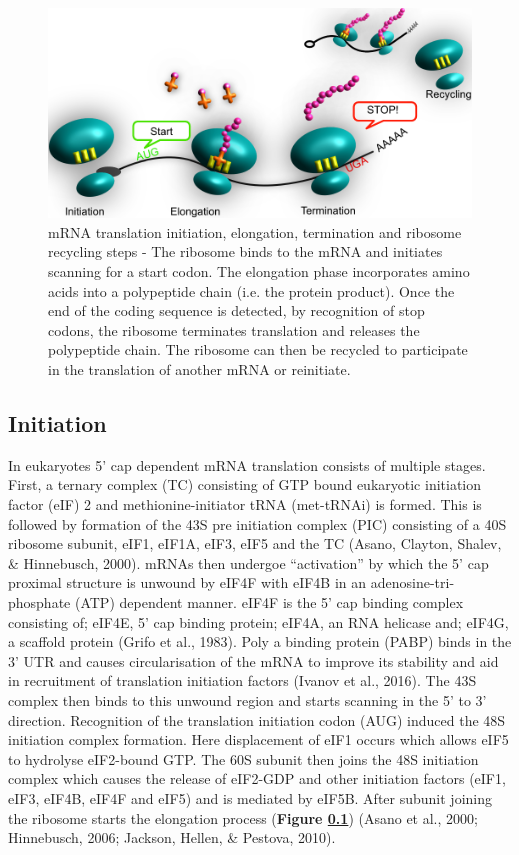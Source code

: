 \documentclass[12pt,openany]{book}
\begin{document}
\begin{figure}
  \includegraphics{./figures/doodleTranslation.pdf}
  \caption{mRNA translation initiation, elongation, termination and ribosome recycling steps - The ribosome binds to the mRNA and initiates scanning for a start codon. The elongation phase incorporates amino acids into a polypeptide chain (i.e. the protein product). Once the end of the coding sequence is detected, by recognition of stop codons, the ribosome terminates translation and releases the polypeptide chain. The ribosome can then be recycled to participate in the translation of another mRNA or reinitiate. \label{fig:doodlemRNASteps}}
\end{figure}

\clearpage

\subsection{Initiation} \label{initiation}

In eukaryotes 5' cap dependent mRNA translation consists of multiple
stages. First, a ternary complex (TC) consisting of GTP bound eukaryotic
initiation factor (eIF) 2 and methionine-initiator tRNA (met-tRNAi) is
formed. This is followed by formation of the 43S pre initiation complex
(PIC) consisting of a 40S ribosome subunit, eIF1, eIF1A, eIF3, eIF5 and
the TC (Asano, Clayton, Shalev, \& Hinnebusch, 2000). mRNAs then
undergoe ``activation'' by which the 5' cap proximal structure is
unwound by eIF4F with eIF4B in an adenosine-tri-phosphate (ATP)
dependent manner. eIF4F is the 5' cap binding complex consisting of;
eIF4E, 5' cap binding protein; eIF4A, an RNA helicase and; eIF4G, a
scaffold protein (Grifo et al., 1983). Poly a binding protein (PABP)
binds in the 3' UTR and causes circularisation of the mRNA to improve
its stability and aid in recruitment of translation initiation factors
(Ivanov et al., 2016). The 43S complex then binds to this unwound region
and starts scanning in the 5' to 3' direction. Recognition of the
translation initiation codon (AUG) induced the 48S initiation complex
formation. Here displacement of eIF1 occurs which allows eIF5 to
hydrolyse eIF2-bound GTP. The 60S subunit then joins the 48S initiation
complex which causes the release of eIF2-GDP and other initiation
factors (eIF1, eIF3, eIF4B, eIF4F and eIF5) and is mediated by eIF5B.
After subunit joining the ribosome starts the elongation process
(\textbf{Figure \ref{initiation}}) (Asano et al., 2000; Hinnebusch,
2006; Jackson, Hellen, \& Pestova, 2010).
\end{document}
